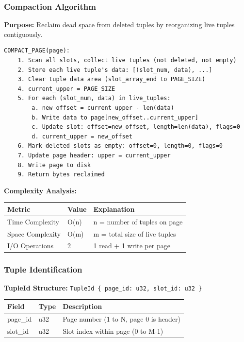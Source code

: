 \documentclass[11pt,a4paper]{article}
\begin{document}
\subsubsection{Compaction Algorithm}

\textbf{Purpose:} Reclaim dead space from deleted tuples by reorganizing live tuples contiguously.

\begin{lstlisting}
COMPACT_PAGE(page):
    1. Scan all slots, collect live tuples (not deleted, not empty)
    2. Store each live tuple's data: [(slot_num, data), ...]
    3. Clear tuple data area (slot_array_end to PAGE_SIZE)
    4. current_upper = PAGE_SIZE
    5. For each (slot_num, data) in live_tuples:
        a. new_offset = current_upper - len(data)
        b. Write data to page[new_offset..current_upper]
        c. Update slot: offset=new_offset, length=len(data), flags=0
        d. current_upper = new_offset
    6. Mark deleted slots as empty: offset=0, length=0, flags=0
    7. Update page header: upper = current_upper
    8. Write page to disk
    9. Return bytes reclaimed
\end{lstlisting}

\textbf{Complexity Analysis:}
\begin{table}[H]
\centering
\begin{tabular}{@{}lll@{}}
\toprule
\textbf{Metric} & \textbf{Value} & \textbf{Explanation} \\
\midrule
Time Complexity & O(n) & n = number of tuples on page \\
Space Complexity & O(m) & m = total size of live tuples \\
I/O Operations & 2 & 1 read + 1 write per page \\
\bottomrule
\end{tabular}
\end{table}

\subsubsection{Tuple Identification}

\textbf{TupleId Structure:} \texttt{TupleId \{ page\_id: u32, slot\_id: u32 \}}

\begin{table}[H]
\centering
\begin{tabular}{@{}lll@{}}
\toprule
\textbf{Field} & \textbf{Type} & \textbf{Description} \\
\midrule
page\_id & u32 & Page number (1 to N, page 0 is header) \\
slot\_id & u32 & Slot index within page (0 to M-1) \\
\bottomrule
\end{tabular}
\end{table}
\end{document}
